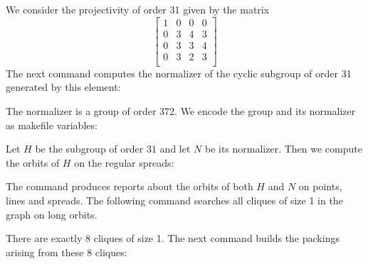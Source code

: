 We consider the projectivity of order 31 given by the matrix
$$
\left[
\begin{array}{cccc}
1&0&0&0\\
0&3&4&3\\
0&3&3&4\\
0&3&2&3\\
\end{array}
\right]
$$
The next command computes the normalizer of the cyclic subgroup of order 31 generated by this element:
{\tt

}
The normalizer is a group of order 372.
We encode the group and its normalizer as makefile variables: 
{\tt

}
{\tt

}
Let $H$ be the subgroup of order $31$ and let $N$ be its normalizer.
Then we compute the orbits of $H$ on the regular spreads:
{\tt

}
The command produces reports about the orbits of both $H$ and $N$ on points, lines and spreads. 
The following command searches all cliques of size 1 in the graph on long orbits. 
{\tt

}
There are exactly 8 cliques of size 1.
The next command builds the packings arising from these 8 cliques:
{\tt

}








